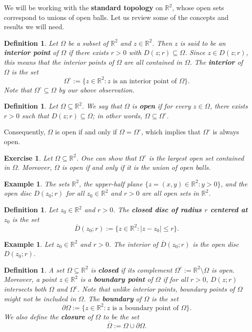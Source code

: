 \documentclass[10pt]{article}
\newcommand{\R}{\mathbb{R}}
\theoremstyle{newstyle}
\newtheorem{defn}[thm]{Definition}
\newtheorem{exercise}[thm]{Exercise}
\newtheorem{exmp}[thm]{Example}
\begin{document}
We will be working with the {\bf standard topology} on $\R^2$, whose open sets correspond to unions 
of open balls. Let us review some of the concepts and results we will need. 

\begin{defn}
Let $\Omega$ be a subset of $\R^2$ and $z \in \R^2$. Then $z$ is said to be an {\bf interior point} 
of $\Omega$ if there exists $r > 0$ with $D(z; r) \subseteq \Omega$. Since 
$z \in D(z; r)$, this means that the interior points of $\Omega$ are all contained in $\Omega$. 
The {\bf interior} of $\Omega$ is the set 
\[ \Omega^{\circ} := \{z \in \R^2 : z \text{ is an interior point of } \Omega\}.\]
Note that $\Omega^\circ \subseteq \Omega$ by our above observation. 
\end{defn}

\begin{defn}
Let $\Omega \subseteq \R^2$. We say that $\Omega$ is {\bf open} if for every $z \in \Omega$, 
there exists $r > 0$ such that $D(z; r) \subseteq \Omega$; in other words, 
$\Omega \subseteq \Omega^\circ$. 
\end{defn}

Consequently, $\Omega$ is open if and only if $\Omega = \Omega^\circ$, 
which implies that $\Omega^\circ$ is always open.

\begin{exercise}
Let $\Omega \subseteq \R^2$. One can show that $\Omega^\circ$ is the largest open set contained in 
$\Omega$. Moreover, $\Omega$ is open if and only if it is the union of open balls.
\end{exercise}

\begin{exmp}
The sets $\R^2$, the upper-half plane $\{z = (x, y) \in \R^2 : y > 0\}$, and the open disc 
$D(z_0; r)$ for all $z_0 \in \R^2$ and $r > 0$ are all open sets in $\R^2$.
\end{exmp}

\begin{defn}
Let $z_0 \in \R^2$ and $r > 0$. The {\bf closed disc of radius $r$ centered at $z_0$} is the set 
\[ \overline{D}(z_0; r) := \{z \in \R^2 : |z - z_0| \leq r\}. \]
\end{defn}

\begin{exmp}
Let $z_0 \in \R^2$ and $r > 0$. The interior of $\overline{D}(z_0; r)$ is the open disc 
$D(z_0; r)$.
\end{exmp}

\begin{defn}
A set $\Omega \subseteq \R^2$ is {\bf closed} if its complement $\Omega^c := \R^2 \setminus \Omega$
is open. Moreover, a point $z \in \R^2$ is a {\bf boundary point} of $\Omega$ if for all 
$r > 0$, $D(z; r)$ intersects both $\Omega$ and $\Omega^c$. Note that unlike interior points, 
boundary points of $\Omega$ might not be included in $\Omega$. The {\bf boundary} of $\Omega$ is 
the set 
\[ \partial \Omega := \{z \in \R^2 : z \text{ is a boundary point of } \Omega\}. \]
We also define the {\bf closure} of $\Omega$ to be the set 
\[ \overline{\Omega} := \Omega \cup \partial \Omega. \]
\end{defn}
\end{document}
